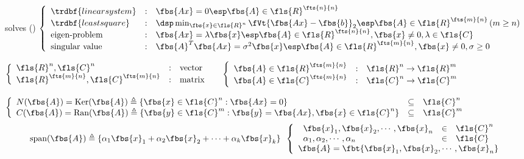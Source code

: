 %
%

 solves ()
$
	\left\{
	\begin{array}{lcl}
		\trdbf{linear system} & : & \fbs{Ax} = 0 \esp \fbs{A} \in \fls{R}^{\fts{n}{n}} \\
		\trdbf{least square} & : & \dsp \min_{\fbs{x}\in\fls{R}^n}\fVt{\fbs{Ax}-\fbs{b}}_2 \esp \fbs{A} \in \fls{R}^{\fts{m}{n}}\,(m\geq n) \\
		\text{eigen-problem} & : & \fbs{Ax}=\lambda\fbs{x} \esp \fbs{A}\in\fls{R}^{\fts{n}{n}},\fbs{x}\neq0,\lambda\in\fls{C}\\
		\text{singular value} & : & \fbs{A}^T\fbs{Ax}=\sigma^2\fbs{x} \esp \fbs{A}\in\fls{R}^{\fts{m}{n}},\fbs{x}\neq0,\sigma\geq0
	\end{array}
	\right.
$

$
	\left\{
	\begin{array}{lcl}
		\fls{R}^n,\fls{C}^n & : & \text{vector} \\
		\fls{R}^{\fts{m}{n}},\fls{C}^{\fts{m}{n}} & : & \text{matrix} \\
	\end{array}
	\right. \quad
$ 
$
	\left\{
	\begin{array}{lcl}
		\fbs{A} \in \fls{R}^{\fts{m}{n}} & : & \fls{R}^n \to \fls{R}^m \\
		\fbs{A} \in \fls{C}^{\fts{m}{n}} & : & \fls{C}^n \to \fls{C}^m \\
	\end{array}
	\right.
$

$
	\left\{
	\begin{array}{lcl}
		N(\fbs{A}) = \textrm{Ker}(\fbs{A}) \triangleq \{\fbs{x} \in \fls{C}^n:\fbs{Ax}=0\} & \subseteq & \fls{C}^n \\
		C(\fbs{A}) = \textrm{Ran}(\fbs{A}) \triangleq \{\fbs{y} \in \fls{C}^m : \fbs{y}=\fbs{Ax},\fbs{x} \in \fls{C}^n\} & \subseteq & \fls{C}^m
	\end{array}
	\right.
$
\[
	\textrm{span}(\fbs{A}) \triangleq \{\alpha_1\fbs{x}_1 + \alpha_2\fbs{x}_2 + \cdots + \alpha_k\fbs{x}_k\} \enspace
	\left\{
		\begin{array}{c}
			\begin{array}{lcl}
				\fbs{x}_1, \fbs{x}_2, \cdots, \fbs{x}_n & \in & \fls{C}^n \\
				\alpha_1, \alpha_2, \cdots, \alpha_n & \in & \fls{C} \\
			\end{array} \\
			\fbs{A} = \fbt{\fbs{x}_1, \fbs{x}_2, \cdots, \fbs{x}_n}
		\end{array}
	\right.
\]

